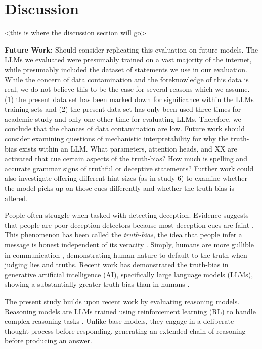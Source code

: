 \documentclass{article}
\begin{document}
\section{Discussion}

<this is where the discussion section will go>

\textbf{Future Work:} Should consider replicating this evaluation on future models. The LLMs we evaluated were presumably trained on a vast majority of the internet, while presumably included the dataset of statements we use in our evaluation. While the concern of data contamination and the foreknowledge of this data is real, we do not believe this to be the case for several reasons which we assume. (1) the present data set has been marked down for significance within the LLMs training sets and (2) the present data set has only been used three times for academic study and only one other time for evaluating LLMs. Therefore, we conclude that the chances of data contamination are low. Future work should consider examining questions of mechanistic interpretability for why the truth-bias exists within an LLM. What parameters, attention heads, and XX are activated that cue certain aspects of the truth-bias? How much is spelling and accurate grammar signs of truthful or deceptive statements? Further work could also investigate offering different hint sizes (as in study 6) to examine whether the model picks up on those cues differently and whether the truth-bias is altered. 

People often struggle when tasked with detecting deception. Evidence suggests that people are poor deception detectors because most deception cues are faint \citep{depaulo_cues_2003, hartwig_why_2011,luke_lessons_2019}. This phenomenon has been called the \textit{truth-bias}, the idea that people infer a message is honest independent of its veracity \citep{levine_truth-default_2014, mclaughlin_communication_2012}. Simply, humans are more gullible in communication \citep{levine_duped_2020}, demonstrating human nature to default to the truth when judging lies and truths. Recent work has demonstrated the truth-bias in generative artificial intelligence (AI), specifically large language models (LLMs), showing a substantially greater truth-bias than in humans \citep{markowitz_generative_2024}.

The present study builds upon recent work \citep{markowitz_generative_2024} by evaluating reasoning models. Reasoning models are LLMs trained using reinforcement learning (RL) to handle complex reasoning tasks \citep{openai_reasoning_2025}. Unlike base models, they engage in a deliberate thought process before responding, generating an extended chain of reasoning before producing an answer.
\end{document}
